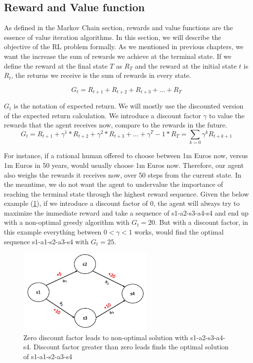 \subsection{Reward and Value function}

As defined in the Markov Chain section, rewards and value functions are the essence of value iteration algorithms. In this section, we will describe the objective of the RL problem formally. As we mentioned in previous chapters, we want the increase the sum of rewards we achieve at the terminal state. If we define the reward at the final state \(T\) as \(R_T\) and the reward at the initial state \(t\) is \(R_t\), the returns we receive is the sum of rewards in every state.

\begin{equation}
    G_t = R_{t+1} + R_{t+2} + R_{t+3} + ... + R_T    
\end{equation}


\(G_t\) is the notation of expected return. We will mostly use the discounted version of the expected return calculation. We introduce a discount factor \(\gamma\) to value the rewards that the agent receives now, compare to the rewards in the future. 
\begin{equation}
    G_t = R_{t+1} + \gamma^1*R_{t+2} + \gamma^2*R_{t+3} + ... + \gamma^T-1*R_T = \sum\limits_{k=0}\gamma^kR_{t+k+1}
\end{equation}

For instance, if a rational human offered to choose between 1m Euros now, versus 1m Euros in 50 years, would usually choose 1m Euros now. Therefore, our agent also weighs the rewards it receives now, over 50 steps from the current state.  In the meantime, we do not want the agent to undervalue the importance of reaching the terminal state through the highest reward sequence.  Given the below example (\ref{fig: nonoptimal}), if we introduce a discount factor of 0, the agent will always try to maximize the immediate reward and take a sequence of s1-a2-s3-a4-s4 and end up with a non-optimal greedy algorithm with \(G_t = 20 \). But with a discount factor, in this example everything between \(0< \gamma < 1\) works, would find the optimal sequence  s1-a1-s2-a3-s4 with \(G_t = 25\).

\begin{figure}[!htbp]
    \centering
    \includegraphics[width=0.6\textwidth]{figures/nonoptimal}
    \caption{Zero discount factor leads to non-optimal solution with s1-a2-s3-a4-s4. Discount factor greater than zero leads finds the optimal solution of s1-a1-s2-a3-s4 }
    \label{fig: nonoptimal}
\end{figure}

